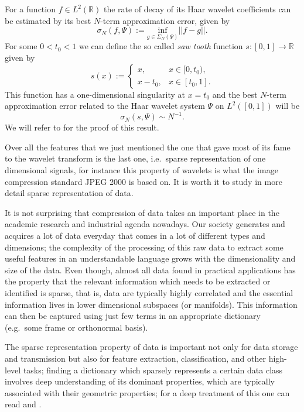 \begin{itemize}
$$$$
For a function $f\in L^2(\mathbb{R})$ the rate of decay of its Haar wavelet coefficients can be estimated by its best $N$-term approximation error, given by
$$
\sigma_N(f,\Psi):=\underset{g\in\Sigma_N(\Psi)}{\text{inf}}||f-g||.
$$
For some $0<t_0<1$ we can define the so called \textit{saw tooth} function $s:[0,1]\longrightarrow \mathbb{R}$ given by
$$
s(x):=\begin{cases} x, & x\in [0,t_0),\\ x-t_0, & x\in [t_0,1].\end{cases}
$$
This function has a one-dimensional singularity at $x=t_0$ and the best $N$-term approximation error related to the Haar wavelet system $\Psi$ on $L^2([0,1])$ will be
$$
\sigma_N(s,\Psi)\sim N^{-1}.
$$
We will refer to \cite{Gitta-notes} for the proof of this result. 
\end{itemize}

\bigskip

Over all the features that we just mentioned the one that gave most of its fame to the wavelet transform is the last one, i.e.\ sparse representation of one dimensional signals, for instance this property of wavelets is what the image compression standard JPEG 2000 is based on. It is worth it to study in more detail sparse representation of data.

\bigskip

It is not surprising that compression of data takes an important place in the academic research and industrial agenda nowadays. Our society generates and acquires a lot of data everyday that comes in a lot of different types and dimensions; the complexity of the processing of this raw data to extract some useful features in an understandable language grows with the dimensionality and size of the data. Even though, almost all data found in practical applications has the property that the relevant information which needs to be extracted or identified is sparse, that is, data are typically highly correlated and the essential information lives in lower dimensional subspaces (or manifolds). This information can then be captured using just few terms in an appropriate dictionary (e.g.\ some frame or orthonormal basis). 

\bigskip

The sparse representation property of data is important not only for data storage and transmission but also for feature extraction, classification, and other high-level tasks; finding a dictionary which sparsely represents a certain data class involves deep understanding of its dominant properties, which are typically associated with their geometric properties; for a deep treatment of this one can read \cite{IntroShearlets} and \cite{Gitta-Lim}.


